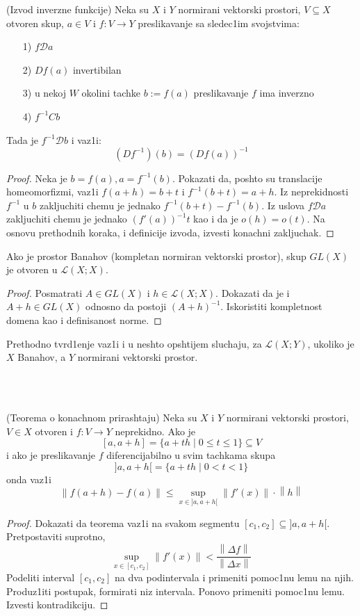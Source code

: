 \documentclass[a4paper,12pt]{article}
\newcommand{\psj}{\subseteq}
\newcommand{\norm}[1]{\left\lVert#1\right\rVert}
\begin{document}
\begin{tma}(Izvod inverzne funkcije)
Neka su $X$ i $Y$ normirani vektorski prostori, $V \psj X$ otvoren skup, $a\in V$ i $f: V \to Y$ preslikavanje sa sledec1im svojstvima:
\begin{itemize}
\item[1)] $f \mathcal{D} a$
\item[2)] $Df(a)$ invertibilan
\item[3)] u nekoj $W$ okolini tachke $b := f(a)$ preslikavanje $f$ ima inverzno
\item[4)] $f^{-1} C b$
\end{itemize}
Tada je $f^{-1} \mathcal{D} b$ i vaz1i:
\[(Df^{-1})(b) = {(Df(a))}^{-1}\]
\end{tma}
\begin{proof}
Neka je $b = f(a), a = f^{-1}(b)$. Pokazati da, poshto su translacije homeomorfizmi, vaz1i $f(a+h) = b+t$ i $f^{-1}(b+t) = a+h$. Iz neprekidnosti $f^{-1}$ u $b$ zakljuchiti chemu je jednako $f^{-1} (b+t) - f^{-1}(b)$. Iz uslova $f \mathcal{D} a$ zakljuchiti chemu je jednako ${(f'(a))}^{-1} t$ kao i da je $o(h) = o(t)$. Na osnovu prethodnih koraka, i definicije izvoda, izvesti konachni zakljuchak.
\end{proof}

\begin{tvr}
Ako je prostor Banahov (kompletan normiran vektorski prostor), skup $GL(X)$ je otvoren u $\mathcal{L}(X;X)$.
\end{tvr}
\begin{proof}
Posmatrati $A \in GL(X)$ i $h \in \mathcal{L} (X;X)$. Dokazati da je i $A+h \in GL(X)$ odnosno da postoji ${(A+h)}^{-1}$. Iskoristiti kompletnost domena kao i definisanost norme.
\end{proof}

\begin{nap}
Prethodno tvrd1enje vaz1i i u neshto opshtijem sluchaju, za $\mathcal{L}(X;Y)$, ukoliko je $X$ Banahov, a $Y$ normirani vektorski prostor.
\end{nap}
\\ \\
\begin{tma}
(Teorema o konachnom prirashtaju) Neka su $X$ i $Y$ normirani vektorski prostori, $V \in X$ otvoren i $f:V \to Y$ neprekidno. Ako je 
\[ [a, a+h] = \{a+th \mid 0 \leq t \leq 1\} \psj V \]
i ako je preslikavanje $f$ diferencijabilno u svim tachkama skupa 
\[]a, a+h[ = \{a+th \mid 0 < t < 1\}\]
onda vaz1i 
\[\norm{f(a+h) - f(a)} \leq \sup_{x \in ]a, a+h[} \norm{f'(x)} \cdot \norm{h}\]
\end{tma}
\begin{proof}
Dokazati da teorema vaz1i na svakom segmentu $[c_1, c_2] \psj ]a, a+h[$. Pretpostaviti suprotno, 
\[ \sup_{x \in [c_1, c_2]} \norm{f'(x)} < \frac{\norm{\Delta f}}{\norm{\Delta x}} \]
Podeliti interval $[c_1, c_2]$ na dva podintervala i primeniti pomoc1nu lemu na njih. Pro\-du\-z1i\-ti postupak, formirati niz intervala. Ponovo primeniti pomoc1nu lemu. Izvesti kon\-tra\-dik\-ci\-ju.
\end{proof}
\end{document}

